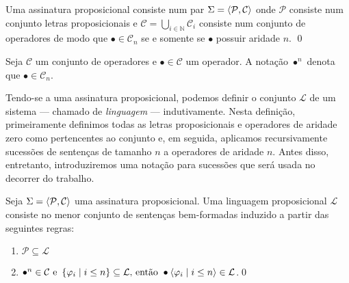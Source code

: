 \begin{definition}[Assinatura]

    Uma assinatura proposicional consiste num par $\Sigma=\langle\mathcal{P},\mathcal{C}\rangle$ onde $\mathcal{P}$ consiste num conjunto letras proposicionais e $\mathcal{C}=\bigcup\limits_{i\in\mathbb{N}}\mathcal{C}_i$ consiste num conjunto de operadores de modo que $\bullet\in\mathcal{C}_n$ se e somente se $\bullet$ possuir aridade $n$.
    \qed{}
\end{definition}

\begin{notation}
    Seja $\mathcal{C}$ um conjunto de operadores e $\bullet\in\mathcal{C}$ um operador. A notação $\bullet^n$ denota que $\bullet\in\mathcal{C}_n$.
\end{notation}

Tendo-se a uma assinatura proposicional, podemos definir o conjunto $\mathcal{L}$ de um sistema --- chamado de \emph{linguagem} --- indutivamente. Nesta definição, primeiramente definimos todas as letras proposicionais e operadores de aridade zero como pertencentes ao conjunto e, em seguida, aplicamos recursivamente sucessões de sentenças de tamanho $n$ a operadores de aridade $n$. Antes disso, entretanto, introduziremos uma notação para sucessões que será usada no decorrer do trabalho.

\begin{definition}[Linguagem]
    Seja $\Sigma=\langle\mathcal{P},\mathcal{C}\rangle$ uma assinatura proposicional. Uma linguagem proposicional $\mathcal{L}$ consiste no menor conjunto de sentenças bem-formadas induzido a partir das seguintes regras:
    \begin{enumerate}[label=\textbf{\emph{(\alph*)}}, left=\parindent]
        \item$\mathcal{P}\subseteq\mathcal{L}$
        \item{}$\bullet^n\in\mathcal{C}\text{ e }\left\{\varphi_i\mid i\leq n\right\}\subseteq\mathcal{L}\text{, então }\bullet\langle\varphi_i\mid i\leq n\rangle\in\mathcal{L}$.\qed{}
    \end{enumerate}
\end{definition}

